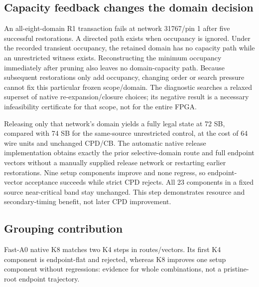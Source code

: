 \documentclass[conference,10pt]{IEEEtran}
\begin{document}
\subsection{Capacity feedback changes the domain decision}
An all-eight-domain R1 transaction fails at network 31767/pin 1 after five successful restorations. A directed path exists when occupancy is ignored. Under the recorded transient occupancy, the retained domain has no capacity path while an unrestricted witness exists. Reconstructing the minimum occupancy immediately after pruning also leaves no domain-capacity path. Because subsequent restorations only add occupancy, changing order or search pressure cannot fix this particular frozen scope/domain. The diagnostic searches a relaxed superset of native re-expansion/closure choices; its negative result is a necessary infeasibility certificate for that scope, not for the entire FPGA.

Releasing only that network's domain yields a fully legal state at 72 SB, compared with 74 SB for the same-source unrestricted control, at the cost of 64 wire units and unchanged CPD/CB. The automatic native release implementation obtains exactly the prior selective-domain route and full endpoint vectors without a manually supplied release network or restarting earlier restorations. Nine setup components improve and none regress, so endpoint-vector acceptance succeeds while strict CPD rejects. All 23 components in a fixed source near-critical band stay unchanged. This step demonstrates resource and secondary-timing benefit, not later CPD improvement.

\subsection{Grouping contribution}
Fast-A0 native K8 matches two K4 steps in routes/vectors. Its first K4 component is endpoint-flat and rejected, whereas K8 improves one setup component without regressions: evidence for whole combinations, not a pristine-root endpoint trajectory.
\end{document}
